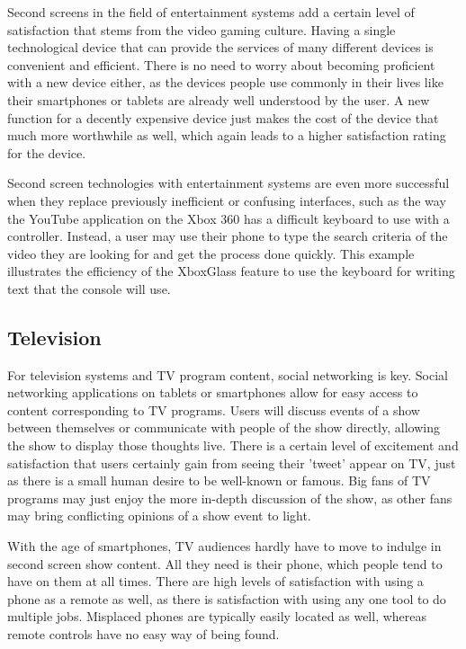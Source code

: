 \documentclass[11pt, oneside]{article}
\begin{document}
Second screens in the field of entertainment systems add a certain level of satisfaction that stems from the video gaming culture. Having a single technological device that can provide the services of many different devices is convenient and efficient. There is no need to worry about becoming proficient with a new device either, as the devices people use commonly in their lives like their smartphones or tablets are already well understood by the user. A new function for a decently expensive device just makes the cost of the device that much more worthwhile as well, which again leads to a higher satisfaction rating for the device. 

Second screen technologies with entertainment systems are even more successful when they replace previously inefficient or confusing interfaces, such as the way the YouTube application on the Xbox 360 has a difficult keyboard to use with a controller. Instead, a user may use their phone to type the search criteria of the video they are looking for and get the process done quickly. This example illustrates the efficiency of the XboxGlass feature to use the keyboard for writing text that the console will use. 

\subsection{Television}
For television systems and TV program content, social networking is key. Social networking applications on tablets or smartphones allow for easy access to content corresponding to TV programs. Users will discuss events of a show between themselves or communicate with people of the show directly, allowing the show to display those thoughts live. There is a certain level of excitement and satisfaction that users certainly gain from seeing their 'tweet' appear on TV, just as there is a small human desire to be well-known or famous. Big fans of TV programs may just enjoy the more in-depth discussion of the show, as other fans may bring conflicting opinions of a show event to light.

With the age of smartphones, TV audiences hardly have to move to indulge in second screen show content. All they need is their phone, which people tend to have on them at all times. There are high levels of satisfaction with using a phone as a remote as well, as there is satisfaction with using any one tool to do multiple jobs. Misplaced phones are typically easily located as well, whereas remote controls have no easy way of being found. 
\end{document}
